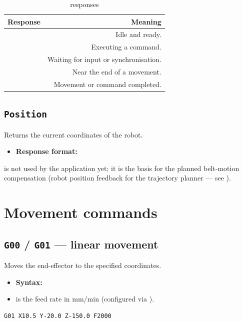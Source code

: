 \begin{table}[h]
  \centering
  \begin{tabularx}{\textwidth}{lD}
    \toprule
    \textbf{Response} & \textbf{Meaning} \\
    \midrule
     & Idle and ready. \\
     & Executing a command. \\
     & Waiting for input or synchronisation. \\
     & Near the end of a movement. \\
     & Movement or command completed. \\
    \bottomrule
  \end{tabularx}
  \caption{ responses}
\end{table}

\subsection{\texttt{Position}}
%
Returns the current coordinates of the robot.
\begin{itemize}
  \item \textbf{Response format:} 
\end{itemize}

\begin{notebox}
   is not used by the application yet; it is the basis for
  the planned belt-motion compensation (robot position feedback for the
  trajectory planner --- see ).
\end{notebox}

\section{Movement commands}

\subsection{\texttt{G00} / \texttt{G01} --- linear movement}
%
Moves the end-effector to the specified coordinates.
\begin{itemize}
  \item \textbf{Syntax:} 
  \item {} is the feed rate in mm/min (configured via
    ).
\end{itemize}
\begin{lstlisting}
G01 X10.5 Y-20.0 Z-150.0 F2000
\end{lstlisting}

